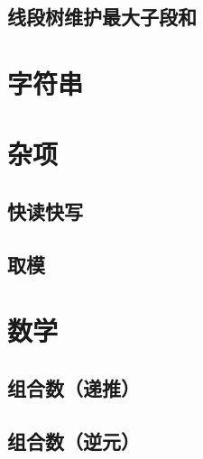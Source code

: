\documentclass[10pt,a4paper]{article}
\begin{document}
\subsection{线段树维护最大子段和}

\section{字符串}
\section{杂项}
\subsection{快读快写}

\subsection{取模}

\section{数学}
\subsection{组合数（递推）}

\subsection{组合数（逆元）}

\end{document}
